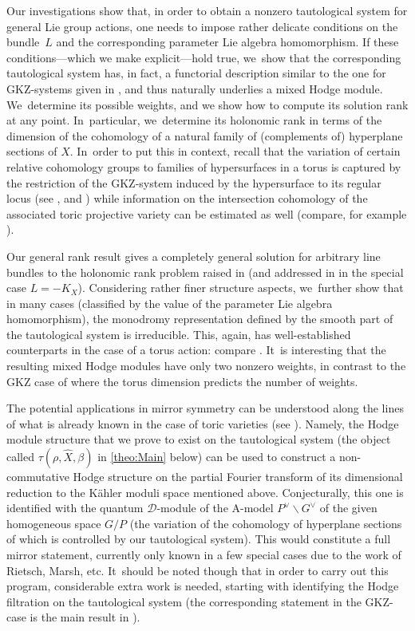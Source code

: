 \documentclass[JEP,XML,SOM,Unicode,published]{cedram}
\newcommand{\cD}{\mathscr{D}}
\begin{document}
Our investigations show that, in order to obtain a
nonzero tautological system for general Lie group actions, one
needs to impose rather delicate conditions on the bundle~$L$ and the
corresponding parameter Lie algebra homomorphism. If
these conditions---which we make explicit---hold true, we~show that
the corresponding tautological system has, in fact, a
functorial description similar to the one for
GKZ-systems given in \cite{GKZ90,SW09}, and thus naturally
underlies a mixed Hodge module. We~determine its possible weights, and
we show how to compute its solution rank at any point. In~particular, we~determine its holonomic rank in terms of the dimension of the
cohomology of a natural family of (complements of) hyperplane sections
of $X$. In~order to put this in context, recall that
the variation of certain relative cohomology
groups to families of hypersurfaces in a torus is captured
by the restriction of the GKZ-system induced by the hypersurface to
its regular locus (see \cite[Th.\,2.13]{Reich2},
\cite{Stienstra} and \cite{ReichWalth-Duco}) while information on the
intersection cohomology of the associated toric projective variety
can be estimated as well (compare, for example
\cite[Prop.\,2.14]{RS12}).

Our general rank result gives a completely general solution for
arbitrary line bundles to the holonomic rank problem raised in
\cite{Bloch_HolRankProb} (and addressed in \cite{HuangLianZhu} in the
special case $L=-K_X$). Considering rather finer structure aspects, we~further show that in many cases (classified by the value of the
parameter Lie algebra homomorphism), the monodromy representation
defined by the smooth part of the tautological system is irreducible.
This, again, has well-established counterparts in the
case of a torus action: compare
\cite{GKZ90,W-taka,Saito11,SW12,Beukers}. It~is interesting that the resulting mixed Hodge modules have only two nonzero weights, in contrast to the GKZ case of \cite{ReichWalth-Weight} where the torus dimension predicts the number of weights.\enlargethispage{\baselineskip}

The potential applications in mirror symmetry can be understood along the lines of what is already known in the case of toric varieties (see \cite{RS10, RS12, RS20}). Namely, the Hodge module structure that we prove to exist on the tautological system (the object called $\tau(\rho, \hat{X}, \beta)$ in \cref{theo:Main} below) can be used to construct a non-commutative Hodge structure on the partial Fourier transform of its dimensional reduction to the Kähler moduli space mentioned above. Conjecturally, this one is identified with the quantum $\cD$\nobreakdash-mod\-ule of the A-model $P^\vee\backslash G^\vee$ of the given homogeneous space $G/P$ (the variation of the cohomology of hyperplane sections of which is controlled by our tautological system). This would constitute a full mirror statement, currently only known in a few special cases due to the work of Rietsch, Marsh, etc. It~should be noted though that in order to carry out this program, considerable extra work is needed, starting with identifying the Hodge filtration on the tautological system (the corresponding statement in the GKZ-case is the main result in \cite{RS20}).
\end{document}
